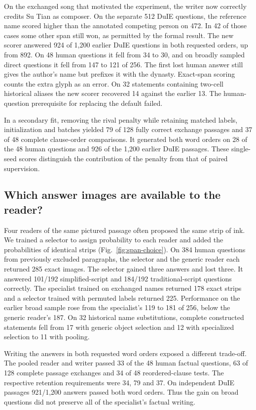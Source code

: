 \documentclass[12pt,a4paper]{article}
\providecommand{\DIFadd}[1]{{\protect\color{blue} \sf #1}} %
\begin{document}
\DIFadd{On the exchanged song that motivated the experiment, the writer now correctly credits Su Tian as composer. On the separate 512 DuIE questions, the reference name scored higher than the annotated competing person on 472. In 42 of those cases some other span still won, as permitted by the formal result. The new scorer answered 924 of 1,200 earlier DuIE questions in both requested orders, up from 892. On 48 human questions it fell from 34 to 30, and on broadly sampled direct questions it fell from 147 to 121 of 256. The first lost human answer still gives the author's name but prefixes it with the dynasty. Exact-span scoring counts the extra glyph as an error. On 32 statements containing two-cell historical aliases the new scorer recovered 14 against the earlier 13. The human-question prerequisite for replacing the default failed.
}

\DIFadd{In a secondary fit, removing the rival penalty while retaining matched labels, initialization and batches yielded 79 of 128 fully correct exchange passages and 37 of 48 complete clause-order comparisons. It generated both word orders on 28 of the 48 human questions and 926 of the 1,200 earlier DuIE passages. These single-seed scores distinguish the contribution of the penalty from that of paired supervision.
}

\subsection*{\DIFadd{Which answer images are available to the reader?}}
\DIFadd{Four readers of the same pictured passage often proposed the same strip of ink. We trained a selector to assign probability to each reader and added the probabilities of identical strips (Fig.~\ref{fig:span-choice}). On 384 human questions from previously excluded paragraphs, the selector and the generic reader each returned 285 exact images. The selector gained three answers and lost three. It answered 101/192 simplified-script and 184/192 traditional-script questions correctly. The specialist trained on exchanged names returned 178 exact strips and a selector trained with permuted labels returned 225. Performance on the earlier broad sample rose from the specialist's 119 to 181 of 256, below the generic reader's 187. On 32 historical name substitutions, complete constructed statements fell from 17 with generic object selection and 12 with specialized selection to 11 with pooling.
}

\DIFadd{Writing the answers in both requested word orders exposed a different trade-off. The pooled reader and writer passed 33 of the 48 human factual questions, 63 of 128 complete passage exchanges and 34 of 48 reordered-clause tests. The respective retention requirements were 34, 79 and 37. On independent DuIE passages 921/1,200 answers passed both word orders. Thus the gain on broad questions did not preserve all of the specialist's factual writing.
}
\end{document}
